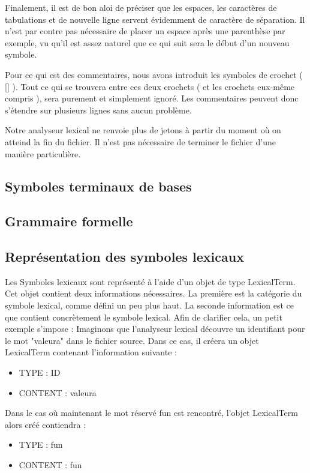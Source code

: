Finalement, il est de bon aloi de préciser que les espaces, les caractères de tabulations et de nouvelle ligne servent évidemment de caractère de séparation. Il n'est par contre pas nécessaire de placer un espace après une parenthèse par exemple, vu qu'il est assez naturel que ce qui suit sera le début d'un nouveau symbole.

Pour ce qui est des commentaires, nous avons introduit les symboles de crochet ( [] ). Tout ce qui se trouvera entre ces deux crochets ( et les crochets eux-même compris ), sera purement et simplement ignoré. Les commentaires peuvent donc s'étendre sur plusieurs lignes sans aucun problème.

Notre analyseur lexical ne renvoie plus de jetons à partir du moment où on atteind la fin du fichier. Il n'est pas nécessaire de terminer le fichier d'une manière particulière.

\subsection{Symboles terminaux de bases}

\subsection{Grammaire formelle}

\subsection{Représentation des symboles lexicaux}

Les Symboles lexicaux sont représenté à l'aide d'un objet de type LexicalTerm. Cet objet contient deux informations nécessaires. La première est la catégorie du symbole lexical, comme défini un peu plus haut. La seconde information est ce que contient concrètement le symbole lexical.
Afin de clarifier cela, un petit exemple s'impose : 
Imaginons que l'analyseur lexical découvre un identifiant pour le mot  "valeura" dans le fichier source. Dans ce cas, il créera un objet LexicalTerm contenant l'information suivante :
\begin{itemize}
	\item TYPE : ID
	\item CONTENT : valeura
\end{itemize}

Dans le cas où maintenant le mot réservé fun est rencontré, l'objet LexicalTerm alors créé contiendra : 
\begin{itemize}
	\item TYPE : fun
	\item CONTENT : fun
\end{itemize}

